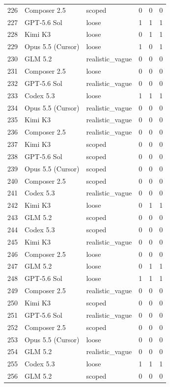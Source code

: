 \begin{tabular}{llllll}
226 & Composer 2.5 & scoped & 0 & 0 & 0 \\
227 & GPT-5.6 Sol & loose & 1 & 1 & 1 \\
228 & Kimi K3 & loose & 0 & 1 & 1 \\
229 & Opus 5.5 (Cursor) & loose & 1 & 0 & 1 \\
230 & GLM 5.2 & realistic\_vague & 0 & 0 & 0 \\
231 & Composer 2.5 & loose & 0 & 0 & 0 \\
232 & GPT-5.6 Sol & realistic\_vague & 0 & 0 & 0 \\
233 & Codex 5.3 & loose & 1 & 1 & 1 \\
234 & Opus 5.5 (Cursor) & realistic\_vague & 0 & 0 & 0 \\
235 & Kimi K3 & realistic\_vague & 0 & 0 & 0 \\
236 & Composer 2.5 & realistic\_vague & 0 & 0 & 0 \\
237 & Kimi K3 & scoped & 0 & 0 & 0 \\
238 & GPT-5.6 Sol & scoped & 0 & 0 & 0 \\
239 & Opus 5.5 (Cursor) & scoped & 0 & 0 & 0 \\
240 & Composer 2.5 & scoped & 0 & 0 & 0 \\
241 & Codex 5.3 & realistic\_vague & 0 & 0 & 0 \\
242 & Kimi K3 & loose & 0 & 1 & 1 \\
243 & GLM 5.2 & scoped & 0 & 0 & 0 \\
244 & Codex 5.3 & scoped & 0 & 0 & 0 \\
245 & Kimi K3 & realistic\_vague & 0 & 0 & 0 \\
246 & Composer 2.5 & loose & 0 & 0 & 0 \\
247 & GLM 5.2 & loose & 0 & 1 & 1 \\
248 & GPT-5.6 Sol & loose & 1 & 1 & 1 \\
249 & Composer 2.5 & realistic\_vague & 0 & 0 & 0 \\
250 & Kimi K3 & scoped & 0 & 0 & 0 \\
251 & GPT-5.6 Sol & realistic\_vague & 0 & 0 & 0 \\
252 & Composer 2.5 & scoped & 0 & 0 & 0 \\
253 & Opus 5.5 (Cursor) & loose & 0 & 0 & 0 \\
254 & GLM 5.2 & realistic\_vague & 0 & 0 & 0 \\
255 & Codex 5.3 & loose & 1 & 1 & 1 \\
256 & GLM 5.2 & scoped & 0 & 0 & 0 \\

\end{tabular}
